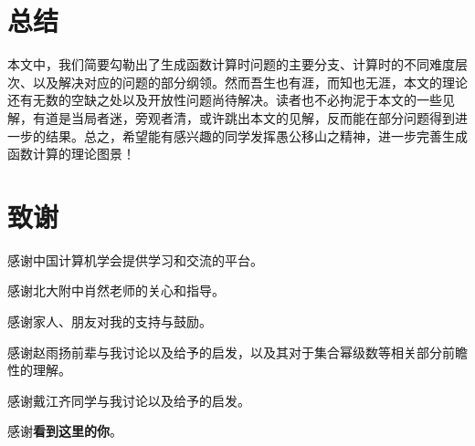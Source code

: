 


\section{总结}

本文中，我们简要勾勒出了生成函数计算时问题的主要分支、计算时的不同难度层次、以及解决对应的问题的部分纲领。然而吾生也有涯，而知也无涯，本文的理论还有无数的空缺之处以及开放性问题尚待解决。读者也不必拘泥于本文的一些见解，有道是当局者迷，旁观者清，或许跳出本文的见解，反而能在部分问题得到进一步的结果。总之，希望能有感兴趣的同学发挥愚公移山之精神，进一步完善生成函数计算的理论图景！

\section*{致谢}

感谢中国计算机学会提供学习和交流的平台。

感谢北大附中肖然老师的关心和指导。

感谢家人、朋友对我的支持与鼓励。

感谢赵雨扬前辈与我讨论以及给予的启发，以及其对于集合幂级数等相关部分前瞻性的理解。

感谢戴江齐同学与我讨论以及给予的启发。

\ifcont
感谢\textbf{看{\color{red}到这里的你}}。
\fi

